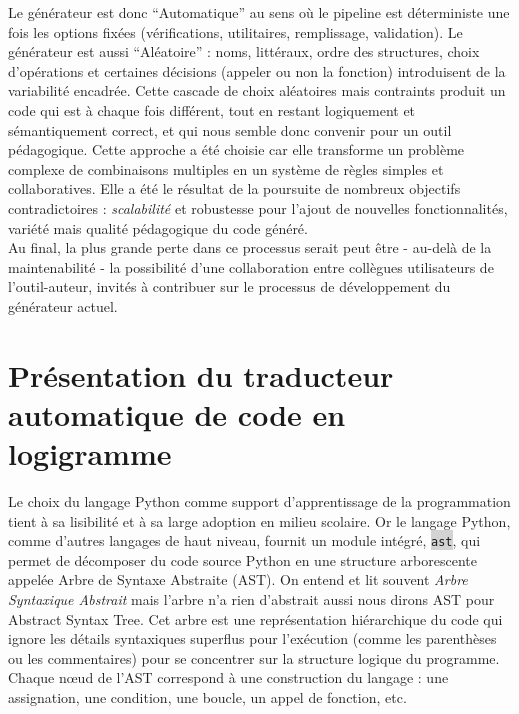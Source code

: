 \documentclass[11pt,a4paper]{article}
\newcommand{\code}[1]{\colorbox{lightgray}{\texttt{\small #1}}}
\begin{document}
Le générateur est donc ``Automatique'' au sens où le pipeline est déterministe une fois les options fixées (vérifications, utilitaires, remplissage, validation). 
\newline
Le générateur est aussi ``Aléatoire'' : noms, littéraux, ordre des structures, choix d’opérations et certaines décisions (appeler ou non la fonction) introduisent de la variabilité encadrée.
\newline
Cette cascade de choix aléatoires mais contraints produit un code qui est à chaque fois différent, tout en restant logiquement et sémantiquement correct, et qui nous semble donc convenir pour un outil pédagogique. Cette approche a été choisie car elle transforme un problème complexe de combinaisons multiples en un système de règles simples et collaboratives. Elle a été le résultat de la poursuite de nombreux objectifs contradictoires : \textit{scalabilité} et robustesse pour l'ajout de nouvelles fonctionnalités, variété mais qualité pédagogique du code généré. \\ Au final, la plus grande perte dans ce processus serait peut être - au-delà de la maintenabilité - la possibilité d'une collaboration entre collègues utilisateurs de l'outil-auteur, invités à contribuer sur le processus de développement du générateur actuel.

\clearpage
\noindent



\clearpage
\section{Présentation du traducteur automatique de code en logigramme}

Le choix du langage Python comme support d'apprentissage de la programmation tient à sa lisibilité 
et à sa large adoption en milieu scolaire.
Or le langage Python, comme d'autres langages de haut niveau, fournit un module intégré, 
\code{ast}, qui permet de décomposer du code source Python en une structure arborescente appelée 
Arbre de Syntaxe Abstraite (AST). On entend et lit souvent \textit{Arbre Syntaxique Abstrait} 
mais l'arbre n'a rien d'abstrait aussi nous dirons AST pour Abstract Syntax Tree. Cet arbre est
 une représentation hiérarchique du code qui ignore les détails syntaxiques superflus pour l'exécution
  (comme les parenthèses ou les commentaires) pour se concentrer sur la structure logique du programme. 
  Chaque nœud de l'AST correspond à une construction du langage : une assignation, une condition, une boucle,
   un appel de fonction, etc. \\
\end{document}
